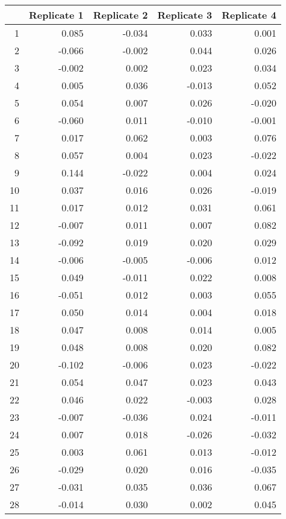 \begin{table}[ht]
\centering
\begin{tabular}{rrrrr}
  \hline
 & Replicate 1 & Replicate 2 & Replicate 3 & Replicate 4 \\ 
  \hline
1 & 0.085 & -0.034 & 0.033 & 0.001 \\ 
  2 & -0.066 & -0.002 & 0.044 & 0.026 \\ 
  3 & -0.002 & 0.002 & 0.023 & 0.034 \\ 
  4 & 0.005 & 0.036 & -0.013 & 0.052 \\ 
  5 & 0.054 & 0.007 & 0.026 & -0.020 \\ 
  6 & -0.060 & 0.011 & -0.010 & -0.001 \\ 
  7 & 0.017 & 0.062 & 0.003 & 0.076 \\ 
  8 & 0.057 & 0.004 & 0.023 & -0.022 \\ 
  9 & 0.144 & -0.022 & 0.004 & 0.024 \\ 
  10 & 0.037 & 0.016 & 0.026 & -0.019 \\ 
  11 & 0.017 & 0.012 & 0.031 & 0.061 \\ 
  12 & -0.007 & 0.011 & 0.007 & 0.082 \\ 
  13 & -0.092 & 0.019 & 0.020 & 0.029 \\ 
  14 & -0.006 & -0.005 & -0.006 & 0.012 \\ 
  15 & 0.049 & -0.011 & 0.022 & 0.008 \\ 
  16 & -0.051 & 0.012 & 0.003 & 0.055 \\ 
  17 & 0.050 & 0.014 & 0.004 & 0.018 \\ 
  18 & 0.047 & 0.008 & 0.014 & 0.005 \\ 
  19 & 0.048 & 0.008 & 0.020 & 0.082 \\ 
  20 & -0.102 & -0.006 & 0.023 & -0.022 \\ 
  21 & 0.054 & 0.047 & 0.023 & 0.043 \\ 
  22 & 0.046 & 0.022 & -0.003 & 0.028 \\ 
  23 & -0.007 & -0.036 & 0.024 & -0.011 \\ 
  24 & 0.007 & 0.018 & -0.026 & -0.032 \\ 
  25 & 0.003 & 0.061 & 0.013 & -0.012 \\ 
  26 & -0.029 & 0.020 & 0.016 & -0.035 \\ 
  27 & -0.031 & 0.035 & 0.036 & 0.067 \\ 
  28 & -0.014 & 0.030 & 0.002 & 0.045 \\ 

\end{tabular}
\end{table}
